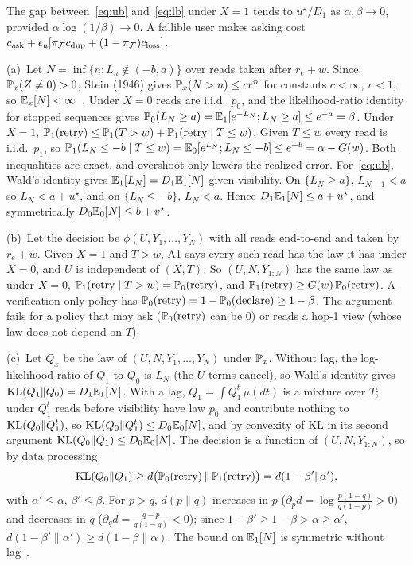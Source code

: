 The gap between~\eqref{eq:ub} and~\eqref{eq:lb} under $X{=}1$ tends to $u^\star/D_1$ as $\alpha,\beta\to0$, provided $\alpha\log(1/\beta)\to0$. A fallible user makes asking cost
$c_{\mathrm{ask}}+\epsilon_u[\pi_{\mathcal F}c_{\mathrm{dup}}+(1-\pi_{\mathcal F})c_{\mathrm{loss}}]$.

(a)~Let $N=\inf\{n:L_n\notin(-b,a)\}$ over reads taken after $r_e+w$. Since $\mathbb{P}_x(Z\neq0)>0$, Stein (1946) gives $\mathbb{P}_x(N>n)\le cr^n$ for constants $c<\infty$, $r<1$, so
$\mathbb{E}_x[N]<\infty$~\cite{tartakovsky2014sequential}. Under $X{=}0$ reads are i.i.d.\ $p_0$, and the likelihood-ratio identity for stopped sequences gives
$\mathbb{P}_0(L_N\ge a)=\mathbb{E}_1[e^{-L_N};L_N\ge a]\le e^{-a}=\beta$. Under $X{=}1$,
$\mathbb{P}_1(\text{retry})\le\mathbb{P}_1(T>w)+\mathbb{P}_1(\text{retry}\mid T\le w)$. Given $T\le w$ every read is i.i.d.\ $p_1$, so $\mathbb{P}_1(L_N\le-b\mid T\le w)=\mathbb{E}_0[e^{L_N};L_N\le-b]\le e^{-b}=\alpha-G(w)$.
Both inequalities are exact, and overshoot only lowers the realized error. For~\eqref{eq:ub}, Wald's identity gives $\mathbb{E}_1[L_N]=D_1\mathbb{E}_1[N]$ given visibility. On $\{L_N\ge a\}$,
$L_{N-1}<a$ so $L_N<a+u^\star$, and on $\{L_N\le-b\}$, $L_N<a$. Hence $D_1\mathbb{E}_1[N]\le a+u^\star$, and symmetrically $D_0\mathbb{E}_0[N]\le b+v^\star$.

(b)~Let the decision be $\phi(U,Y_1,\dots,Y_N)$ with all reads end-to-end and taken by $r_e+w$. Given $X{=}1$ and $T>w$, A1 says every such read has the law it has under $X{=}0$,
and $U$ is independent of $(X,T)$. So $(U,N,Y_{1:N})$ has the same law as under $X{=}0$, $\mathbb{P}_1(\text{retry}\mid T>w)=\mathbb{P}_0(\text{retry})$, and
$\mathbb{P}_1(\text{retry})\ge G(w)\,\mathbb{P}_0(\text{retry})$. A verification-only policy has $\mathbb{P}_0(\text{retry})=1-\mathbb{P}_0(\text{declare})\ge1-\beta$. The argument fails for a policy that may ask
($\mathbb{P}_0(\text{retry})$ can be 0) or reads a hop-1 view (whose law does not depend on $T$).

(c)~Let $Q_x$ be the law of $(U,N,Y_1,\dots,Y_N)$ under $\mathbb{P}_x$. Without lag, the log-likelihood ratio of $Q_1$ to $Q_0$ is $L_N$ (the $U$ terms cancel), so Wald's identity gives
$\mathrm{KL}(Q_1\|Q_0)=D_1\mathbb{E}_1[N]$. With a lag, $Q_1=\int Q_1^{t}\,\mu(dt)$ is a mixture over $T$; under $Q_1^t$ reads before visibility have law $p_0$ and contribute nothing to
$\mathrm{KL}(Q_0\|Q_1^t)$, so $\mathrm{KL}(Q_0\|Q_1^t)\le D_0\mathbb{E}_0[N]$, and by convexity of KL in its second argument $\mathrm{KL}(Q_0\|Q_1)\le D_0\mathbb{E}_0[N]$. The decision is a function of
$(U,N,Y_{1:N})$, so by data processing~\cite{cover2006elements}
\[
\mathrm{KL}(Q_0\|Q_1)\ge d\big(\mathbb{P}_0(\text{retry})\,\|\,\mathbb{P}_1(\text{retry})\big)=d(1-\beta'\|\alpha'),
\]
with $\alpha'\le\alpha$, $\beta'\le\beta$. For $p>q$, $d(p\|q)$ increases in $p$ ($\partial_pd=\log\frac{p(1-q)}{q(1-p)}>0$) and decreases in $q$ ($\partial_qd=\frac{q-p}{q(1-q)}<0$); since
$1-\beta'\ge1-\beta>\alpha\ge\alpha'$, $d(1-\beta'\|\alpha')\ge d(1-\beta\|\alpha)$. The bound on $\mathbb{E}_1[N]$ is symmetric without lag~\cite{kaufmann2016complexity}.

